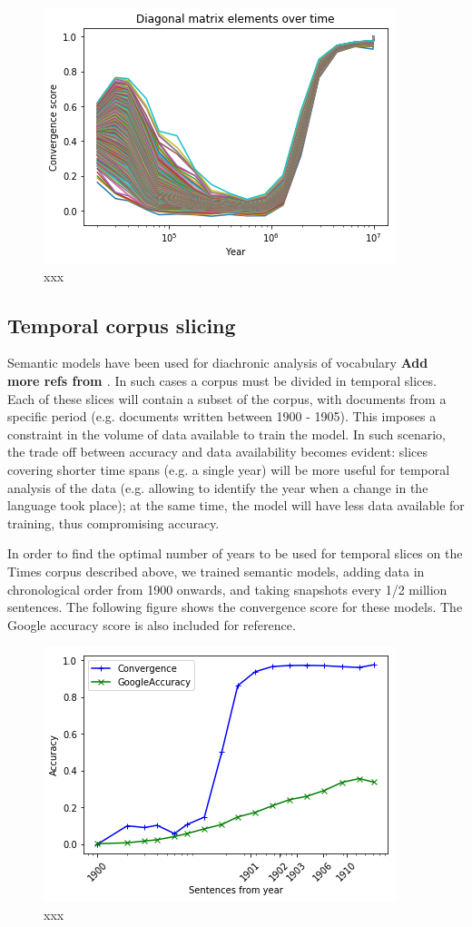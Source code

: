\documentclass{article} %
\begin{document}
\begin{figure}
 \includegraphics[scale=1]{figure2.png} 
 \caption{xxx}
 \label{fig:2}
\end{figure}

\subsection{Temporal corpus slicing}
\label{subsec:temporal_corpus_slicing}
Semantic models have been used for diachronic analysis of vocabulary \cite{Martinez_Histo2016,Hellrich_COLING2016} \textbf{Add more refs from \cite{Hellrich_COLING2016}}. In such cases a corpus must be divided in temporal slices. Each of these slices will contain a subset of the corpus, with documents from a specific period (e.g. documents written between 1900 - 1905). This imposes a constraint in the volume of data available to train the model. In such scenario, the trade off between accuracy and data availability becomes evident: slices covering shorter time spans (e.g. a single year) will be more useful for temporal analysis of the data (e.g. allowing to identify the year when a change in the language took place); at the same time, the model will have less data available for training, thus compromising accuracy.

In order to find the optimal number of years to be used for temporal slices on the Times corpus described above, we trained semantic models, adding data in chronological order from 1900 onwards, and taking snapshots every 1/2 million sentences. The following figure shows the convergence score for these models. The Google accuracy score is also included for reference.

\begin{figure}
 \includegraphics[scale=1]{figure3.png} 
 \caption{xxx}
 \label{fig:3}
\end{figure}
\end{document}
